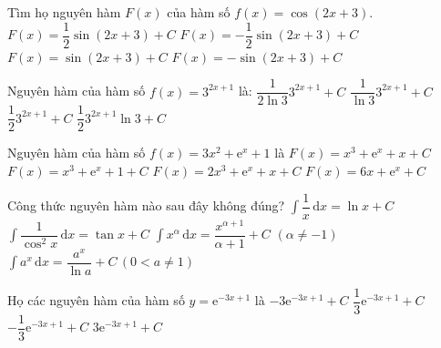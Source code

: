 \begin{ex}%
	Tìm họ nguyên hàm $F(x)$ của hàm số $ f(x)=\cos\left(2x+3\right)$.
	\choice
	{\True $F(x)=\dfrac{1}{2}\sin\left(2x+3\right)+C$}
	{$F(x)=-\dfrac{1}{2}\sin\left(2x+3\right)+C$}
	{$F(x)=\sin\left(2x+3\right)+C$}
	{$F(x)=-\sin\left(2x+3\right)+C$}
\end{ex}

\begin{ex}%
	Nguyên hàm của hàm số $f(x)=3^{2x+1}$ là:
	\choice
	{\True $\dfrac{1}{2\ln 3}{3^{2x+1}}+C$}
	{$\dfrac{1}{\ln 3}{3^{2x+1}}+C$}
	{$\dfrac{1}{2}{3^{2x+1}}+C$}
	{$\dfrac{1}{2}{3^{2x+1}}\ln 3+C$}
\end{ex}

\begin{ex}%
	Nguyên hàm của hàm số $ f(x)=3x^2+\mathrm{e}^x+1$ là
	\choice
	{\True $F(x)=x^3+\mathrm{e}^x+x+C$}
	{$F(x)=x^3+\mathrm{e}^x+1+C$}
	{$F(x)=2x^3+\mathrm{e}^x+x+C$}
	{$F(x)=6x+\mathrm{e}^x+C$}
\end{ex}

\begin{ex}%
	Công thức nguyên hàm nào sau đây không đúng?
	\choice
	{\True $\displaystyle\int\dfrac{1}{x}\mathrm{\,d}x=\ln x+C$}
	{$\displaystyle\int\dfrac{1}{\cos^2 x}\mathrm{\,d}x=\tan x+C$}
	{$\displaystyle\int x^\alpha\mathrm{\,d}x=\dfrac{x^{\alpha+1}}{\alpha+1}+C\,\,\left(\alpha\ne-1\right)$}
	{$\displaystyle\int a^x\mathrm{\,d}x=\dfrac{a^x}{\ln a}+C\,\left(0 < a\ne 1\right)$}
\end{ex}

\begin{ex}%
	Họ các nguyên hàm của hàm số $ y=\mathrm{e}^{-3x+1}$ là
	\choice
	{$-3\mathrm{e}^{-3x+1}+C$}
	{$\dfrac{1}{3}\mathrm{e}^{-3x+1}+C$}
	{\True $-\dfrac{1}{3}\mathrm{e}^{-3x+1}+C$}
	{$ 3\mathrm{e}^{-3x+1}+C$}
\end{ex}

